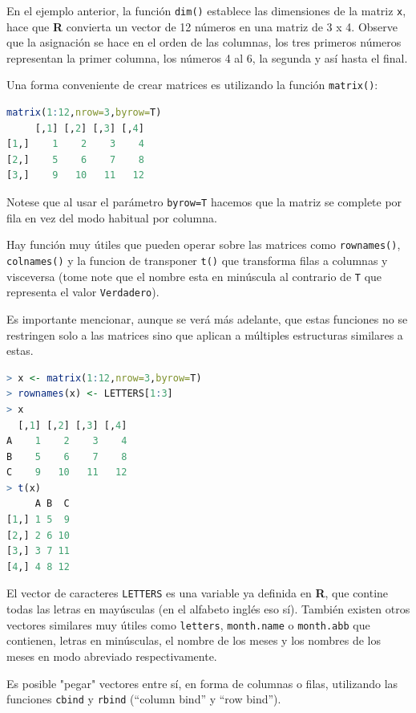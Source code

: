 En el ejemplo anterior, la función \texttt{dim()} establece las dimensiones de
la matriz \texttt{x}, hace que \textbf{R} convierta un vector de 12 números en
una matriz de 3 x 4. Observe que la asignación se hace en el orden de las
columnas, los tres primeros números representan la primer columna, los números
4 al 6, la segunda y así hasta el final.

Una forma conveniente de crear matrices es utilizando la función \texttt{matrix()}:

\begin{lstlisting}[language=R]
matrix(1:12,nrow=3,byrow=T)
     [,1] [,2] [,3] [,4]
[1,]    1    2    3    4
[2,]    5    6    7    8
[3,]    9   10   11   12
\end{lstlisting}

Notese que al usar el parámetro \texttt{byrow=T} hacemos que la matriz se
complete por fila en vez del modo habitual por columna.

Hay función muy útiles que pueden operar sobre las matrices como
\texttt{rownames()}, \texttt{colnames()} y la funcion de transponer
\texttt{t()} que transforma filas a columnas y visceversa (tome note que el
nombre esta en minúscula al contrario de \texttt{T} que representa el valor
\texttt{Verdadero}).

\begin{tradnote} Es importante mencionar, aunque se verá más adelante, que
estas funciones no se restringen solo a las matrices sino que aplican a
múltiples estructuras similares a estas.\end{tradnote}

\begin{lstlisting}[language=R]
> x <- matrix(1:12,nrow=3,byrow=T)
> rownames(x) <- LETTERS[1:3]
> x
  [,1] [,2] [,3] [,4]
A    1    2    3    4
B    5    6    7    8
C    9   10   11   12
> t(x)
     A B  C
[1,] 1 5  9
[2,] 2 6 10
[3,] 3 7 11
[4,] 4 8 12
\end{lstlisting}

El vector de caracteres \texttt{LETTERS} es una variable ya definida en
\textbf{R}, que contine todas las letras en mayúsculas (en el alfabeto inglés
eso sí). También existen otros vectores similares muy útiles como
\texttt{letters}, \texttt{month.name} o \texttt{month.abb} que contienen,
letras en minúsculas, el nombre de los meses y los nombres de los meses en modo
abreviado respectivamente.

Es posible "pegar" vectores entre sí, en forma de columnas o filas, utilizando
las funciones \texttt{cbind} y \texttt{rbind} (``column bind'' y ``row bind'').

